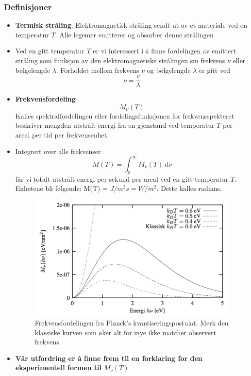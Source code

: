 \subsubsection*{Definisjoner}
\begin{itemize}
    \item \textbf{Termisk stråling}: Elektromagnetisk stråling sendt ut av et materiale ved en temperatur $ T $. Alle legemer emitterer og absorber denne strålingen
    \item Ved en gitt temperatur $ T $ er vi interessert i å finne fordelingen av emittert stråling som funksjon av den elektromagnetiske strålingen sin frekvens $ ν $ eller bølgelengde $ λ $. Forholdet mellom frekvens $ ν $ og bølgelengde $ λ $ er gitt ved
    \begin{equation}
    ν = \frac{c}{λ}
    \end{equation}
    
    \item \textbf{Frekvensfordeling}
    \begin{equation}
    M_{ν}(T)
    \end{equation}
    Kalles spektralfordelingen eller fordelingsfunksjonen for frekvensspekteret beskriver mengden utstrålt energi fra en gjenstand ved temperatur $ T $ per areal per tid per frekvensenhet. 
    
    \item Integrert over alle frekvenser 
    \begin{equation}
    M(T) = \int_{0}^{\infty} M_{ν}(T) \ dν
    \end{equation}
    får vi totalt utstrålt energi per sekund per areal ved en gitt temperatur $ T $. Enhetene bli følgende: M(T) = $ J / m^{2}s = W / m^{2} $. Dette kalles radians. 
    
    \begin{figure}[h!]
        \centering
        \includegraphics[scale = .5]{Figures/Frekvensfordeling kvantiserinspostulat.png}
        \caption{Frekvensfordelingen fra Planck's kvantiseringspostulat. Merk den klassiske kurven som øker alt for mye ikke matcher observert frekvens}
        \label{fig: Frekvensfordeling kvantiserinspostulat}
    \end{figure}
    
    \item \textbf{Vår utfordring er å finne frem til en forklaring for den eksperimentell formen til} $M_{ν}(T)$
\end{itemize}

